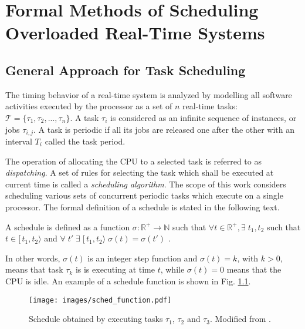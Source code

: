 \chapter{Formal Methods of Scheduling Overloaded Real-Time Systems}
\label{fm}
\section{General Approach for Task Scheduling}
The timing behavior of a real-time system is analyzed by modelling all software activities executed by the processor as a set of $n$ real-time tasks: $\mathcal{T} = \{\tau_1, \tau_2, ..., \tau_n\}$.
A task $\tau_i$ is considered as an infinite sequence of instances, or jobs $\tau_{i,j}$.
A task is periodic if all its jobs are released one after the other with an interval $T_i$ called the task period.

The operation of allocating the CPU to a selected task is referred to as \textit{dispatching}.
A set of rules for selecting the task which shall be executed at current time is called a 
\textit{scheduling algorithm}.
The scope of this work considers scheduling various sets of concurrent periodic tasks which execute on a single processor.
The formal definition of a schedule is stated in the following text.
\begin{mydef}
A schedule is defined as a function $\sigma : \mathbb{R}^{+} \rightarrow \mathbb{N}$ such that 
$\forall t \in \mathbb{R}^{+}, \exists \; t_1, t_2$ such that $t \in [\, t_1, t_2 \rangle$ and 
$\forall \; t' \; \exists \; [\, t_1, t_2 \rangle \; \sigma(t) = \sigma(t')$
\cite{buttazzo2011hard}.
\end{mydef}
In other words, $\sigma(t)$ is an integer step function and $\sigma(t) = k$, with $k > 0$, means that task $\tau_k$ is is executing at time $t$, while $\sigma(t) = 0$ means that the CPU is idle.
An example of a schedule function is shown in Fig. \ref{schedule_function}.
\begin{figure}[ht]
    \centering
    \texttt{[image: images/sched\_function.pdf]}
    \caption{Schedule obtained by executing tasks $\tau_1$, $\tau_2$ and $\tau_3$. Modified from \cite{buttazzo2011hard}.}
    \label{schedule_function}
\end{figure}

